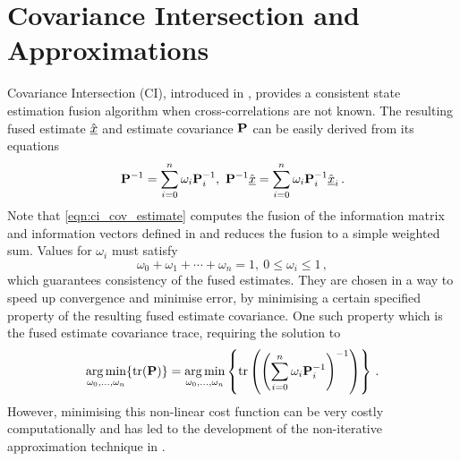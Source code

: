 \documentclass[letterpaper, 10 pt, conference]{ieeeconf}  %
\begin{document}
\section{Covariance Intersection and Approximations} \label{sec:ci}
Covariance Intersection (CI), introduced in \cite{julierNondivergentEstimationAlgorithm1997}, provides a consistent state estimation fusion algorithm when cross-correlations are not known. The resulting fused estimate $\hat{{\underline{x}}}$ and estimate covariance ${{\mathbf{P}}}$ can be easily derived from its equations
\begin{equation}
   {\ensuremath{{\mathbf{P}}}}^{-1}=\sum_{i=0}^{n}\omega_i {{\mathbf{P}}}_i^{-1},\ {{\mathbf{P}}}^{-1} \hat{{\underline{x}}} =\sum_{i=0}^{n}\omega_i {{\mathbf{P}}}_i^{-1} \hat{{\underline{x}}}_i\,. \label{eqn:ci_cov_estimate}
\end{equation}
Note that \eqref{eqn:ci_cov_estimate} computes the fusion of the information matrix and information vectors defined in \cite{niehsenInformationFusionBased2002} and reduces the fusion to a simple weighted sum.
Values for $\omega_i$ must satisfy
\begin{equation}
   \omega_0 + \omega_1 + \cdots + \omega_n = 1,\ 0 \leq \omega_i \leq 1\,, \label{eqn:ci_omega_sum_bound}
\end{equation}
which guarantees consistency of the fused estimates. They are chosen in a way to speed up convergence and minimise error, by minimising a certain specified property of the resulting fused estimate covariance. One such property which is the fused estimate covariance trace, requiring the solution to
\begin{equation}
   \operatorname*{arg\,min}_{\omega_0,\dots,\omega_n} \{\operatorname{tr}({{\mathbf{P}}})\} = \operatorname*{arg\,min}_{\omega_0,\dots,\omega_n} \left\{\operatorname{tr}\left(\left(\sum_{i=0}^{n}\omega_i {{\mathbf{P}}}_i^{-1}\right)^{-1}\right)\right\}\,. \label{eqn:ci_trace_min}
\end{equation}
However, minimising this non-linear cost function can be very costly computationally and has led to the development of the non-iterative approximation technique in \cite{niehsenInformationFusionBased2002}.
\end{document}
